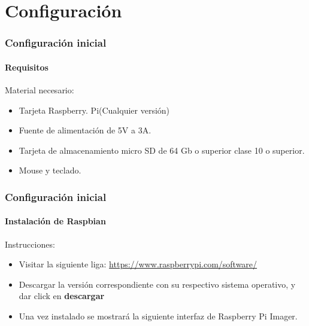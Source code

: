 \documentclass{beamer}
\begin{document}
	\section{Configuración}
	\begin{frame}
		\frametitle{Configuración inicial}
		\framesubtitle{Requisitos}
		
		\begin{mybox}{Material necesario:}
			\begin{itemize}
				\item Tarjeta Raspberry. Pi(Cualquier versión)
				\item Fuente de alimentación de 5V a 3A.
				\item Tarjeta de almacenamiento micro SD de 64 Gb o superior clase 10 o superior.
				\item Mouse y teclado.
			\end{itemize}
		\end{mybox}
		
			
	\end{frame}

	\begin{frame}
		\frametitle{Configuración inicial}
		\framesubtitle{Instalación de Raspbian}
		
		\begin{mybox}{Instrucciones:} 
				\begin{itemize}
					\item Visitar la siguiente liga: \url{https://www.raspberrypi.com/software/}
					\item Descargar la versión correspondiente con su respectivo sistema operativo, y dar click en \textbf{descargar}
					\item Una vez instalado se mostrará la siguiente interfaz de Raspberry Pi Imager.
				\end{itemize}
		\end{mybox}
		
		
	\end{frame}
	
\end{document}
